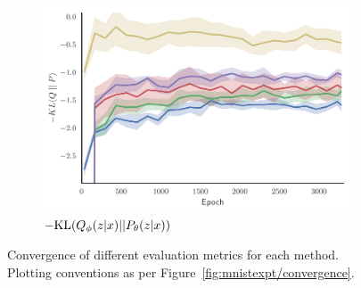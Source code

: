 \begin{figure}[h]
\begin{subfigure}[b]{0.33\textwidth}
		\includegraphics[width=\textwidth]{figures/tighter_bounds/optim_convergence_KL}
		\caption{$-\mathrm{KL}(Q_{\phi}(z \lvert x) || P_{\theta}(z \lvert x))$ \label{fig-app:mnistexpt/convergence/kl}}
	\end{subfigure}
	\caption{Convergence of different evaluation metrics for each method.  Plotting conventions as per
		 Figure~\ref{fig:mnistexpt/convergence}.
		\vspace{-12pt}  \label{fig-app:mnistexpt/convergence}}
\end{figure}